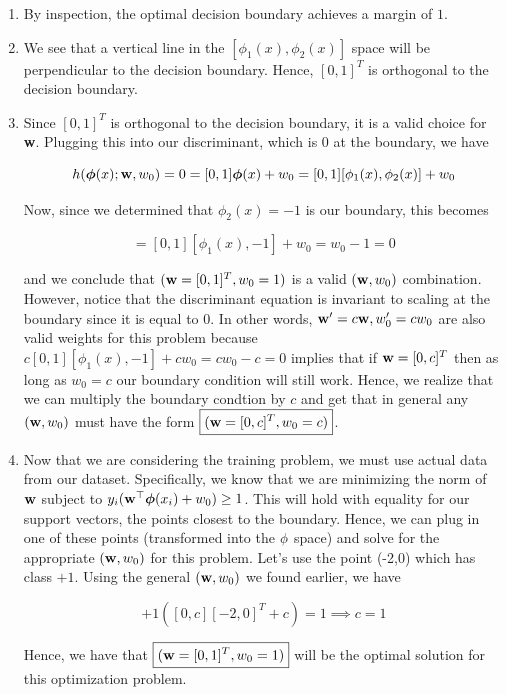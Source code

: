 \documentclass[submit]{harvardml}
\begin{document}
\begin{enumerate}
    \item By inspection, the optimal decision boundary achieves a margin of $\boxed{1}$.
    
    \item We see that a vertical line in the $[\phi_1(x), \phi_2(x)]$ space will be perpendicular to the decision boundary. Hence, $\boxed{[0,1]^T}$ is orthogonal to the decision boundary.
    
    \item Since $[0,1]^T$ is orthogonal to the decision boundary, it is a valid choice for \textbf{w}. Plugging this into our discriminant, which is 0 at the boundary, we have
    
    $$ h(\boldsymbol{\phi}(x);\mathbf{w},w_0)= 0 = [0,1]\boldsymbol{\phi}(x) +w_0 = [0,1] [\phi_1(x), \phi_2(x)] +w_0 $$ 
    
    Now, since we determined that $\phi_2(x) = -1$ is our boundary, this becomes
    
    $$ = [0,1] [\phi_1(x), -1] +w_0 = w_0 - 1 = 0$$ 
    
    and we conclude that $(\mathbf{w} = [0,1]^T,w_0 = 1)$ is a valid $(\mathbf{w},w_0)$ combination. However, notice that the discriminant equation is invariant to scaling at the boundary since it is equal to $0$. In other words, $\bold{w'} = c\mathbf{w}, w_0' = cw_0$ are also valid weights for this problem because $c[0,1][\phi_1(x), -1] +cw_0 = cw_0 - c = 0$ implies that if $\mathbf{w} = [0,c]^T$ then as long as $w_0 = c$ our boundary condition will still work. Hence, we realize that we can multiply the boundary condtion by $c$ and get that in general any $(\mathbf{w},w_0)$ must have the form $\boxed{(\mathbf{w} = [0,c]^T,w_0 = c)}$.
    
    \item Now that we are considering the training problem, we must use actual data from our dataset. Specifically, we know that we are minimizing the norm of $\mathbf{w}$ subject to $y_i(\mathbf{w}^\top \boldsymbol{\phi}(x_i) + w_0) \geq 1$. This will hold with equality for our support vectors, the points closest to the boundary. Hence, we can plug in one of these points (transformed into the $\bold\phi$ space) and solve for the appropriate $(\mathbf{w},w_0)$ for this problem. Let's use the point (-2,0) which has class $+1$. Using the general $(\mathbf{w},w_0)$ we found earlier, we have
    
    $$ +1([0,c][-2,0]^T + c) = 1 \implies c = 1$$
    
    Hence, we have that  $\boxed{(\mathbf{w} = [0,1]^T,w_0 = 1)}$ will be the optimal solution for this optimization problem. 
    

\end{enumerate}
\end{document}
